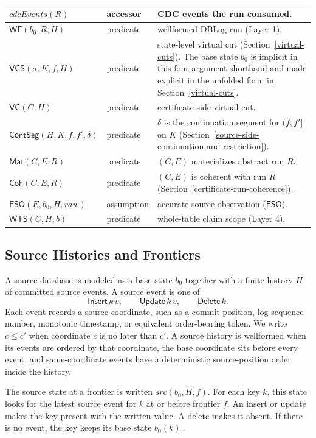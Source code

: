 \documentclass[letterpaper,10pt,twocolumn]{article}
\newcommand{\Src}{\mathit{src}}
\newcommand{\CdcEvents}{\mathit{cdcEvents}}
\newcommand{\RawObs}{\mathit{raw}}
\newcommand{\WF}{\mathsf{WF}}
\newcommand{\FSO}{\mathsf{FSO}}
\newcommand{\Mat}{\mathsf{Mat}}
\newcommand{\Coh}{\mathsf{Coh}}
\newcommand{\VC}{\mathsf{VC}}
\newcommand{\VCS}{\mathsf{VCS}}
\newcommand{\WTS}{\mathsf{WTS}}
\newcommand{\ContSeg}{\mathsf{ContSeg}}
\begin{document}
\begin{table}[t]
\begin{tabularx}{\textwidth}{@{}l@{\hskip 1em}l@{\hskip 1em}Y@{}}
$\CdcEvents(R)$ & accessor & CDC events the run consumed.\\
\midrule
$\WF(b_0,R,H)$ & predicate &
  wellformed DBLog run (Layer 1).\\
$\VCS(\sigma,K,f,H)$ & predicate &
  state-level virtual cut (Section~\ref{virtual-cuts}). The base state
  $b_0$ is implicit in this four-argument shorthand and made explicit
  in the unfolded form in Section~\ref{virtual-cuts}.\\
$\VC(C,H)$ & predicate &
  certificate-side virtual cut.\\
$\ContSeg(H,K,f,f',\delta)$ & predicate &
  $\delta$ is the continuation segment for $(f,f']$ on $K$
  (Section~\ref{source-side-continuation-and-restriction}).\\
$\Mat(C,E,R)$ & predicate &
  $(C,E)$ materializes abstract run $R$.\\
$\Coh(C,E,R)$ & predicate &
  $(C,E)$ is coherent with run $R$ (Section~\ref{certificate-run-coherence}).\\
$\FSO(E,b_0,H,\RawObs)$ & assumption &
  accurate source observation ($\FSO$).\\
$\WTS(C,H,b)$ & predicate &
  whole-table claim scope (Layer 4).\\
\bottomrule
\end{tabularx}
\end{table}

\subsection{Source Histories and
Frontiers}\label{source-histories-and-frontiers}

A source database is modeled as a base state $b_0$ together with a
finite history $H$ of committed source events. A source event is
one of
\[
  \mathsf{Insert}\,k\,v,\qquad
  \mathsf{Update}\,k\,v,\qquad
  \mathsf{Delete}\,k.
\]
Each event records a source coordinate, such as a commit position, log sequence
number, monotonic timestamp, or equivalent order-bearing
token. We write $c \le c'$ when
coordinate $c$ is no later than $c'$. A
source history is wellformed when its events are ordered by that
coordinate, the base coordinate sits before every event, and
same-coordinate events have a deterministic source-position order inside
the history.

The source state at a frontier is written $\Src(b_0,H,f)$.
For each key $k$, this state looks for the latest source event
for $k$ at or before frontier $f$. An insert or update
makes the key present with the written value. A delete makes it absent.
If there is no event, the key keeps its base state $b_0(k)$.
\end{document}
